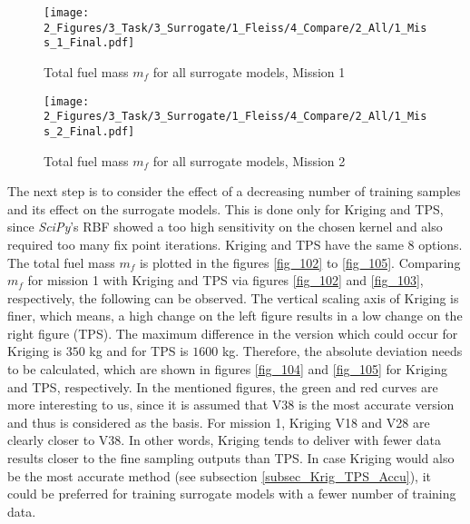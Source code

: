 \begin{figure}[!h]
    \begin{minipage}[h]{0.46\textwidth}
        \centering
        \texttt{[image: 2\_Figures/3\_Task/3\_Surrogate/1\_Fleiss/4\_Compare/2\_All/1\_Miss\_1\_Final.pdf]}
        \caption{Total fuel mass $m_{f}$ for all surrogate models, Mission 1}
        \label{fig_100}    
    \end{minipage}
    \hfill
    \begin{minipage}{0.46\textwidth}
        \centering
        \texttt{[image: 2\_Figures/3\_Task/3\_Surrogate/1\_Fleiss/4\_Compare/2\_All/1\_Miss\_2\_Final.pdf]}
        \caption{Total fuel mass $m_{f}$ for all surrogate models, Mission 2}
        \label{fig_101}    
    \end{minipage}
\end{figure} 

\FloatBarrier
The next step is to consider the effect of a decreasing number 
of training samples and its effect on the surrogate models.
This is done only for Kriging and TPS, since 
\emph{SciPy}'s RBF showed 
a too high sensitivity on the chosen kernel and also 
required too many fix point iterations. 
Kriging and TPS have the same 8 options. 
The total fuel mass $m_{f}$ is plotted 
in the figures \ref{fig_102} to \ref{fig_105}. 
Comparing  $m_{f}$ for mission 1 
with Kriging 
and TPS via figures \ref{fig_102} and \ref{fig_103}, respectively, 
the following can be observed. The vertical scaling axis 
of Kriging is finer, which means, a high change on the left 
figure results in a low change on the right figure (TPS).
The maximum difference in the version which could occur 
for Kriging is $350$ kg and for TPS is $1600$ kg. Therefore, 
the absolute deviation needs to be calculated, which are 
shown in figures \ref{fig_104} and \ref{fig_105} for 
Kriging and TPS, respectively. In the mentioned figures, 
the green and red curves are more interesting to us, since 
it is assumed that V38 is the most accurate version and 
thus is considered as the basis. For mission 1, Kriging 
V18 and V28 are clearly closer to V38. In other words, 
Kriging tends to deliver with fewer data 
results closer to the fine sampling outputs than TPS. In case 
Kriging would also be the most accurate method
(see subsection \ref{subsec_Krig_TPS_Accu}), it 
could be preferred for training surrogate models 
with a fewer number of training data.

